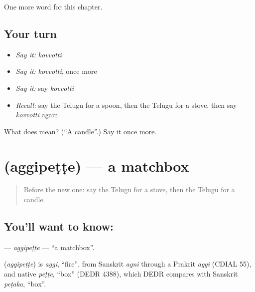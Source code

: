 \begin{grammarlens}[title={What you've built}]
One more word for this chapter.
\end{grammarlens}

\subsection*{Your turn}
\begin{itemize}
\raggedright
  \item \emph{Say it:} \emph{kovvotti}
  \item \emph{Say it:} \emph{kovvotti}, once more
  \item \emph{Say it:} say \emph{kovvotti}
  \item \emph{Recall:} say the Telugu for a spoon, then the Telugu for a stove, then say \emph{kovvotti} again
\end{itemize}

\begin{tcolorbox}[breakable,colback=teal!4,colframe=teal!35!black,title={Before you move on}]
What does  mean? (\textquotedblleft{}A candle\textquotedblright{}.) Say it once more.
\end{tcolorbox}
\section[\texorpdfstring{\te{అగ్గిపెట్టె} (aggipeṭṭe)}{అగ్గిపెట్టె (aggipeṭṭe)}]{ (aggipeṭṭe) — a matchbox}

\label{lesson:TE-C113-aggipette}



\begin{quote}
Before the new one: say the Telugu for a stove, then the Telugu for a candle.
\end{quote}

\subsection*{You'll want to know: }
\textbf{} — \emph{aggipeṭṭe} — \textquotedblleft{}a matchbox\textquotedblright{}.

\begin{cousinweb}
\textbf{} (\emph{aggipeṭṭe}) is \emph{aggi}, \textquotedblleft{}fire\textquotedblright{}, from Sanskrit \emph{agni} through a Prakrit \emph{aggi} (CDIAL 55), and native \emph{peṭṭe}, \textquotedblleft{}box\textquotedblright{} (DEDR 4388), which DEDR compares with Sanskrit \emph{peṭaka}, \textquotedblleft{}box\textquotedblright{}.
\end{cousinweb}

